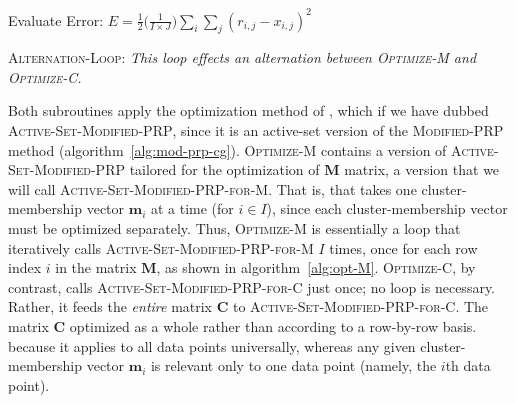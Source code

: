 \begin{algorithm}[h]
 Evaluate Error: $E = \frac{1}{2} \big(\frac{1}{I\times J}\big) \sum_i \sum_j (r_{i,j} - x_{i,j})^2$\;\label{line:init-E} 
\caption{\textsc{Alternation-Loop}: \textit{This loop effects an alternation between \textsc{Optimize-M} and \textsc{Optimize-C}.}}
\label{alg:m-and-c}
\end{algorithm}

Both subroutines apply the 
optimization method of \citet{cheng-and-li:2012}, which if we have 
dubbed \textsc{Active-Set-Modified-PRP}, since it is an active-set version of the 
\textsc{Modified-PRP} method (algorithm~\ref{alg:mod-prp-cg}). 
\textsc{Optimize-M} contains a version of \textsc{Active-Set-Modified-PRP} tailored for
 the optimization of $\textbf{M}$ matrix, a version that we will call \textsc{Active-Set-Modified-PRP-for-M}.
  That is, 
that takes one cluster-membership vector $\textbf{m}_i$ at a time (for $i \in I$), 
since each cluster-membership vector must be optimized separately. 
Thus, \textsc{Optimize-M} is essentially a loop that iteratively calls 
\textsc{Active-Set-Modified-PRP-for-M} $I$ times, once for each row index $i$ in 
the matrix $\textbf{M}$, as shown in algorithm~\ref{alg:opt-M}.
\textsc{Optimize-C}, by contrast, calls \textsc{Active-Set-Modified-PRP-for-C} just once; no loop is necessary. 
Rather, it feeds the \emph{entire} matrix $\textbf{C}$ to 
\textsc{Active-Set-Modified-PRP-for-C}. The matrix $\textbf{C}$ optimized 
as a whole rather than according to a row-by-row basis.
because it applies to all data points universally, 
whereas any given cluster-membership vector $\textbf{m}_i$ is relevant only to one 
data point (namely, the $i$th data point).



